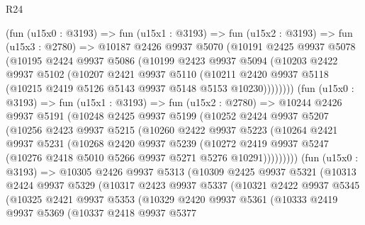 \begin{lexlean}{R24}
\begin{coremodule}
        (fun (u15x0 : @3193) =>
        fun (u15x1 : @3193) =>
        fun (u15x2 : @3193) =>
        fun (u15x3 : @2780) =>
        @10187
          @2426
          @9937
          @5070
          (@10191
            @2425
            @9937
            @5078
            (@10195
              @2424
              @9937
              @5086
              (@10199
                @2423
                @9937
                @5094
                (@10203
                  @2422
                  @9937
                  @5102
                  (@10207
                    @2421
                    @9937
                    @5110
                    (@10211
                      @2420
                      @9937
                      @5118
                      (@10215 @2419 @5126 @5143 @9937 @5148 @5153 @10230))))))))
        (fun (u15x0 : @3193) =>
        fun (u15x1 : @3193) =>
        fun (u15x2 : @2780) =>
        @10244
          @2426
          @9937
          @5191
          (@10248
            @2425
            @9937
            @5199
            (@10252
              @2424
              @9937
              @5207
              (@10256
                @2423
                @9937
                @5215
                (@10260
                  @2422
                  @9937
                  @5223
                  (@10264
                    @2421
                    @9937
                    @5231
                    (@10268
                      @2420
                      @9937
                      @5239
                      (@10272
                        @2419
                        @9937
                        @5247
                        (@10276 @2418 @5010 @5266 @9937 @5271 @5276 @10291)))))))))
        (fun (u15x0 : @3193) =>
        @10305
          @2426
          @9937
          @5313
          (@10309
            @2425
            @9937
            @5321
            (@10313
              @2424
              @9937
              @5329
              (@10317
                @2423
                @9937
                @5337
                (@10321
                  @2422
                  @9937
                  @5345
                  (@10325
                    @2421
                    @9937
                    @5353
                    (@10329
                      @2420
                      @9937
                      @5361
                      (@10333
                        @2419
                        @9937
                        @5369
                        (@10337
                          @2418
                          @9937
                          @5377

\end{coremodule}
\end{lexlean}

